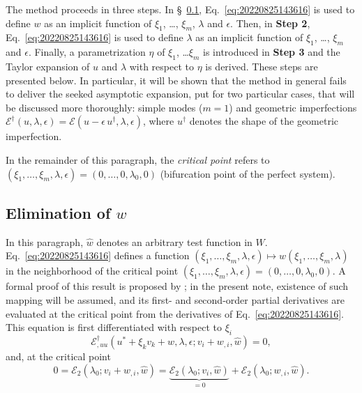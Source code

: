 \documentclass[12pt, final]{scrartcl}
\theoremstyle{definition}
\newcommand{\E}{\mathcal E}
\newcommand{\EE}{\mathcal E ^ \dagger}
\newcommand{\uu}{u^\dagger}
\begin{document}
The method proceeds in three steps. In \S~\ref{sec:20221020140204}, Eq.~\eqref{eq:20220825143616} is used to define $w$
as an implicit function of $\xi_1$, \dots, $\xi_m$, $\lambda$ and \(\epsilon\). Then, in \textbf{Step 2},
Eq.~\eqref{eq:20220825143616} is used to define $\lambda$ as an implicit function of $\xi_1$, \dots, $\xi_m$ and
\(\epsilon\). Finally, a parametrization $\eta$ of $\xi_1$, \dots $\xi_m$ is introduced in \textbf{Step 3} and the
Taylor expansion of $u$ and $\lambda$ with respect to $\eta$ is derived. These steps are presented below. In particular,
it will be shown that the method in general fails to deliver the seeked asymptotic expansion, put for two particular
cases, that will be discussed more thoroughly: simple modes (\(m = 1\)) and geometric imperfections
\(\EE(u, \lambda, \epsilon) = \E(u - \epsilon \, \uu, \lambda, \epsilon)\), where \(\uu\) denotes the shape of the
geometric imperfection.

In the remainder of this paragraph, the \emph{critical point} refers to
\((\xi_1, \ldots, \xi_m, \lambda, \epsilon) = (0, \ldots, 0, \lambda_0, 0)\) (bifurcation point of the perfect system).

\subsection{Elimination of \(w\)}
\label{sec:20221020140204}

In this paragraph, $\hat{w}$ denotes an arbitrary test function in $W$. Eq.~\eqref{eq:20220825143616} defines a function
$(\xi_1, \ldots, \xi_m, \lambda, \epsilon) \mapsto w(\xi_1, \ldots, \xi_m, \lambda)$ in the neighborhood of the critical point
$(\xi_1, \ldots, \xi_m, \lambda, \epsilon) = (0, \ldots, 0, \lambda_0, 0)$. A formal proof of this result is proposed by \textcite{poti1987}; in the
present note, existence of such mapping will be assumed, and its first- and second-order partial derivatives are
evaluated at the critical point from the derivatives of Eq.~\eqref{eq:20220825143616}. This equation is first
differentiated with respect to $\xi_i$
\begin{equation}
  \label{eq:20220826140926}
  \EE_{,uu}(u^\ast + \xi_k v_k + w, \lambda, \epsilon; v_i + w_{,i}, \hat{w}) = 0,
\end{equation}
and, at the critical point
\begin{equation}
  \label{eq:20220825150219}
  0 = \E_2(\lambda_0; v_i + w_{,i}, \hat{w}) = \underbrace{\E_2(\lambda_0; v_i, \hat{w})}_{=0} + \E_2(\lambda_0; w_{,i}, \hat{w}).
\end{equation}
\end{document}
